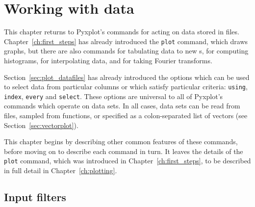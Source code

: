 %
%
%
%
%



\chapter{Working with data}
\label{ch:numerics}

This chapter returns to Pyxplot's commands for acting on data stored in files.
Chapter~\ref{ch:first_steps} has already introduced the {\tt plot} command,
which draws graphs, but there are also commands for tabulating data to new
\datafile s, for computing histograms, for interpolating data, and for taking
Fourier transforms.

Section~\ref{sec:plot_datafiles} has already introduced the options which can
be used to select data from particular columns or which satisfy particular
criteria: {\tt using}, {\tt index}, {\tt every} and {\tt select}.  These
options are universal to all of Pyxplot's commands which operate on data sets.
In all cases, data sets can be read from files, sampled from functions, or
specified as a colon-separated list of vectors (see
Section~\ref{sec:vectorplot}).

This chapter begins by describing other common features of these commands,
before moving on to describe each command in turn. It leaves the details of the
{\tt plot} command, which was introduced in Chapter~\ref{ch:first_steps}, to be
described in full detail in Chapter~\ref{ch:plotting}.

\section{Input filters}
\label{sec:filters}

